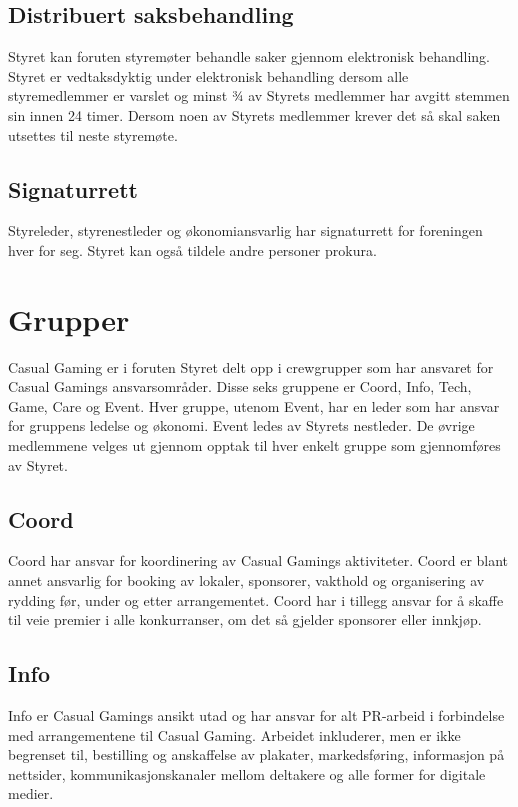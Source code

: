 \subsection{Distribuert saksbehandling}
Styret kan foruten styremøter behandle saker gjennom elektronisk behandling. Styret er vedtaksdyktig under elektronisk behandling dersom alle styremedlemmer er varslet og minst ¾ av Styrets medlemmer har avgitt stemmen sin innen 24 timer. Dersom noen av Styrets medlemmer krever det så skal saken utsettes til neste styremøte.

\subsection{Signaturrett}
Styreleder, styrenestleder og økonomiansvarlig har signaturrett for foreningen hver for seg. Styret kan også tildele andre personer prokura.

\section{Grupper}
Casual Gaming er i foruten Styret delt opp i crewgrupper som har ansvaret for Casual Gamings ansvarsområder. Disse seks gruppene er Coord, Info, Tech, Game, Care og Event. Hver gruppe, utenom Event, har en leder som har ansvar for gruppens ledelse og økonomi. Event ledes av Styrets nestleder. De øvrige medlemmene velges ut gjennom opptak til hver enkelt gruppe som gjennomføres av Styret.

\subsection{Coord}
Coord har ansvar for koordinering av Casual Gamings aktiviteter. Coord er blant annet ansvarlig for booking av lokaler, sponsorer, vakthold og organisering av rydding før, under og etter arrangementet. Coord har i tillegg ansvar for å skaffe til veie premier i alle konkurranser, om det så gjelder sponsorer eller innkjøp.

\subsection{Info}
Info er Casual Gamings ansikt utad og har ansvar for alt PR-arbeid i forbindelse med arrangementene til Casual Gaming. Arbeidet inkluderer, men er ikke begrenset til, bestilling og anskaffelse av plakater, markedsføring, informasjon på nettsider, kommunikasjonskanaler mellom deltakere og alle former for digitale medier.

